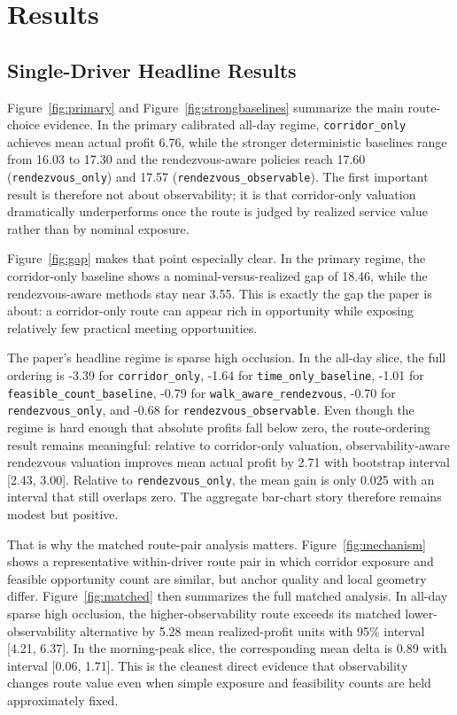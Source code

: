 \documentclass[journal]{IEEEtran}
\begin{document}
\section{Results}
\subsection{Single-Driver Headline Results}
Figure~\ref{fig:primary} and Figure~\ref{fig:strongbaselines} summarize the main route-choice evidence. In the primary calibrated all-day regime, \texttt{corridor\_only} achieves mean actual profit 6.76, while the stronger deterministic baselines range from 16.03 to 17.30 and the rendezvous-aware policies reach 17.60 (\texttt{rendezvous\_only}) and 17.57 (\texttt{rendezvous\_observable}). The first important result is therefore not about observability; it is that corridor-only valuation dramatically underperforms once the route is judged by realized service value rather than by nominal exposure.

Figure~\ref{fig:gap} makes that point especially clear. In the primary regime, the corridor-only baseline shows a nominal-versus-realized gap of 18.46, while the rendezvous-aware methods stay near 3.55. This is exactly the gap the paper is about: a corridor-only route can appear rich in opportunity while exposing relatively few practical meeting opportunities.

The paper's headline regime is sparse high occlusion. In the all-day slice, the full ordering is -3.39 for \texttt{corridor\_only}, -1.64 for \texttt{time\_only\_baseline}, -1.01 for \texttt{feasible\_count\_baseline}, -0.79 for \texttt{walk\_aware\_rendezvous}, -0.70 for \texttt{rendezvous\_only}, and -0.68 for \texttt{rendezvous\_observable}. Even though the regime is hard enough that absolute profits fall below zero, the route-ordering result remains meaningful: relative to corridor-only valuation, observability-aware rendezvous valuation improves mean actual profit by 2.71 with bootstrap interval [2.43, 3.00]. Relative to \texttt{rendezvous\_only}, the mean gain is only 0.025 with an interval that still overlaps zero. The aggregate bar-chart story therefore remains modest but positive.

That is why the matched route-pair analysis matters. Figure~\ref{fig:mechanism} shows a representative within-driver route pair in which corridor exposure and feasible opportunity count are similar, but anchor quality and local geometry differ. Figure~\ref{fig:matched} then summarizes the full matched analysis. In all-day sparse high occlusion, the higher-observability route exceeds its matched lower-observability alternative by 5.28 mean realized-profit units with 95\% interval [4.21, 6.37]. In the morning-peak slice, the corresponding mean delta is 0.89 with interval [0.06, 1.71]. This is the cleanest direct evidence that observability changes route value even when simple exposure and feasibility counts are held approximately fixed.
\end{document}
